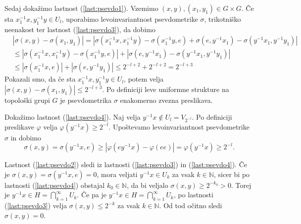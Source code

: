 \documentclass[mat1]{fmfdelo}
\newcommand{\N}{\mathbb N}
\begin{document}
\begin{dokaz}
Sedaj dokažimo lastnost (\ref{last:psevdo1}). Vzemimo $(x, y), (x_1,y_1) \in G \times G$. Če sta $x_1^{-1}x, y_1^{-1}y \in U_l$, uporabimo levoinvariantnost psevdometrike $\sigma$, trikotniško neenakost ter lastnost (\ref{last:psevdo3}), da dobimo
\begin{align*}
&|\sigma(x, y) - \sigma(x_1, y_1)| = |\sigma(x_1^{-1}x, x_1^{-1}y) - \sigma(x_1^{-1}y, e) + \sigma(e, y^{-1}x_1) - \sigma(y^{-1}x_1, y^{-1}y_1)| \\
&\leq |\sigma(x_1^{-1}x, x_1^{-1}y) - \sigma(x_1^{-1}y, e)| + |\sigma(e, y^{-1}x_1) - \sigma(y^{-1}x_1, y^{-1}y_1)| \\
&\leq |\sigma(x_1^{-1}x, e)| + |\sigma(e, y^{-1}y_1)| \leq 2^{-l+2} + 2^{-l+2} = 2^{-l+3}
\end{align*}
Pokazali smo, da če sta $x_1^{-1}x, y_1^{-1}y \in U_l$, potem velja $|\sigma(x, y) - \sigma(x_1, y_1)| \leq 2^{-l+3}$. Po definiciji leve uniformne strukture na topološki grupi $G$ je psevdometrika $\sigma$ enakomerno zvezna preslikava.

Dokažimo lastnost (\ref{last:psevdo4}). Naj velja $y^{-1}x \notin U_l = V_{2^{-l}}$. Po definiciji preslikave $\varphi$ velja $\varphi(y^{-1}x) \geq 2^{-l}$. Upoštevamo levoinvariantnost psevdometrike $\sigma$ in dobimo
\[ \sigma(x, y) = \sigma(y^{-1}x, e) \geq |\varphi(ey^{-1}x) - \varphi(ee)| = \varphi(y^{-1}x) \geq 2^{-l}. \]

Lastnost (\ref{last:psevdo2}) sledi iz lastnosti (\ref{last:psevdo3}) in (\ref{last:psevdo4}). Če je $\sigma(x, y) = \sigma(y^{-1}x, e) = 0$, mora veljati $y^{-1}x \in U_k$ za vsak $k \in \N$, sicer bi po lastnosti (\ref{last:psevdo4}) obstajal $k_0 \in \N$, da bi veljalo $\sigma(x, y) \geq 2^{-k_0} > 0$. Torej je $y^{-1}x \in H = \bigcap_{k=1}^\infty U_k$. Če pa je $y^{-1}x \in H = \bigcap_{k=1}^\infty U_k$, po lastnosti (\ref{last:psevdo3}) velja $\sigma(x,y) \leq 2^{-k}$ za vsak $k \in \N$. Od tod očitno sledi $\sigma(x, y) = 0$.


\end{dokaz}
\end{document}
